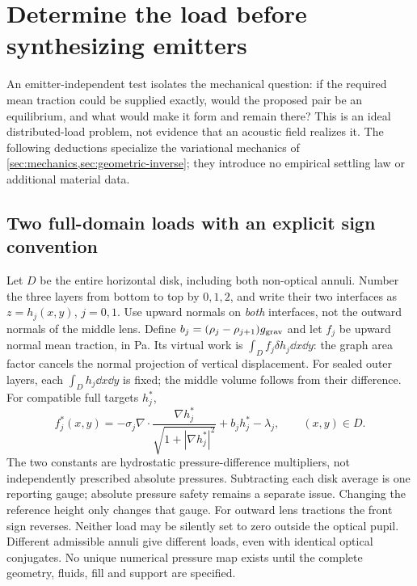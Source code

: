 \section{Determine the load before synthesizing emitters}
\label{sec:ideal-load}

An emitter-independent test isolates the mechanical question: if the required
mean traction could be supplied exactly, would the proposed pair be an
equilibrium, and what would make it form and remain there? This is an ideal
distributed-load problem, not evidence that an acoustic field realizes it.
The following deductions specialize the variational mechanics of
\cref{sec:mechanics,sec:geometric-inverse}; they introduce no empirical
settling law or additional material data.

\subsection{Two full-domain loads with an explicit sign convention}
Let $D$ be the entire horizontal disk, including both non-optical annuli.
Number the three layers from bottom to top by $0,1,2$, and write their two
interfaces as $z=h_j(x,y)$, $j=0,1$. Use upward normals on \emph{both}
interfaces, not the outward normals of the middle lens. Define
$b_j=(\rho_j-\rho_{j+1})g_{\rm grav}$ and let $f_j$ be upward normal mean
traction, in Pa. Its virtual work is $\int_D f_j\delta h_j\dd x\dd y$:
the graph area factor cancels the normal projection of vertical displacement.
For sealed outer layers, each $\int_D h_j\dd x\dd y$ is fixed; the middle
volume follows from their difference. For compatible full targets $h_j^*$,
\begin{equation}
 f_j^*(x,y)=-\sigma_j\nabla\cdot
       \frac{\nabla h_j^*}{\sqrt{1+|\nabla h_j^*|^2}}
       +b_j h_j^*-\lambda_j,\qquad (x,y)\in D.
 \label{eq:ideal-two-loads}
\end{equation}
The two constants are hydrostatic pressure-difference multipliers, not
independently prescribed absolute pressures. Subtracting each disk average
is one reporting gauge; absolute pressure safety remains a separate issue.
Changing the reference height only changes that gauge. For outward lens
tractions the front sign reverses. Neither load may be silently set to zero
outside the optical pupil. Different admissible annuli give different loads,
even with identical optical conjugates. No unique numerical pressure map
exists until the complete geometry, fluids, fill and support are specified.

